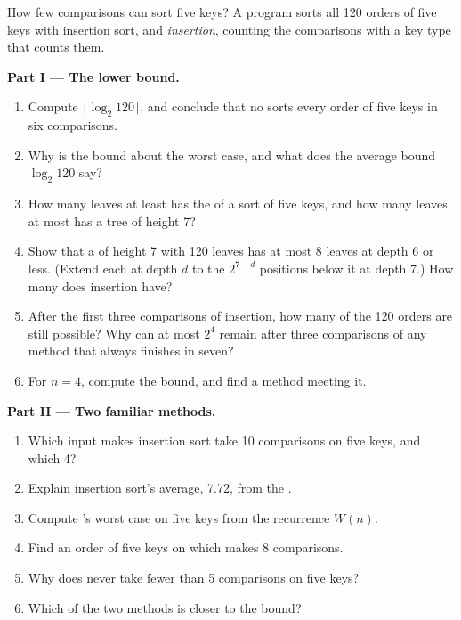 \begin{problem}\label{pb:b1:sorting:1}
How few comparisons can sort five keys? A program sorts all 120 orders of five keys with insertion sort,  and
\emph{ insertion}, counting the comparisons with a key type that counts them.
\label{out:b1:sorting:sort5}

\medskip\noindent\textbf{Part I --- The lower bound.}
\begin{enumerate}
\item Compute $\lceil \log_2 120 \rceil$, and conclude that no  sorts every order of five keys in six
comparisons.
\item Why is the bound about the worst case, and what does the average bound $\log_2 120$ say?
\item How many leaves at least has the  of a sort of five keys, and how many leaves at most has a tree of
height 7?
\item Show that a  of height 7 with 120 leaves has at most 8 leaves at depth 6 or less. (Extend each
 at depth $d$ to the $2^{7 - d}$ positions below it at depth 7.) How many does  insertion have?
\item After the first three comparisons of  insertion, how many of the 120 orders are still possible? Why can at
most $2^4$ remain after three comparisons of any method that always finishes in seven?
\item For $n = 4$, compute the bound, and find a method meeting it.
\end{enumerate}

\medskip\noindent\textbf{Part II --- Two familiar methods.}
\begin{enumerate}[resume]
\item Which input makes insertion sort take 10 comparisons on five keys, and which 4?
\item Explain insertion sort's average, 7.72, from the .
\item Compute 's worst case on five keys from the recurrence $W(n)$.
\item Find an order of five keys on which  makes 8 comparisons.
\item Why does  never take fewer than 5 comparisons on five keys?
\item Which of the two methods is closer to the bound?
\end{enumerate}


\end{problem}
